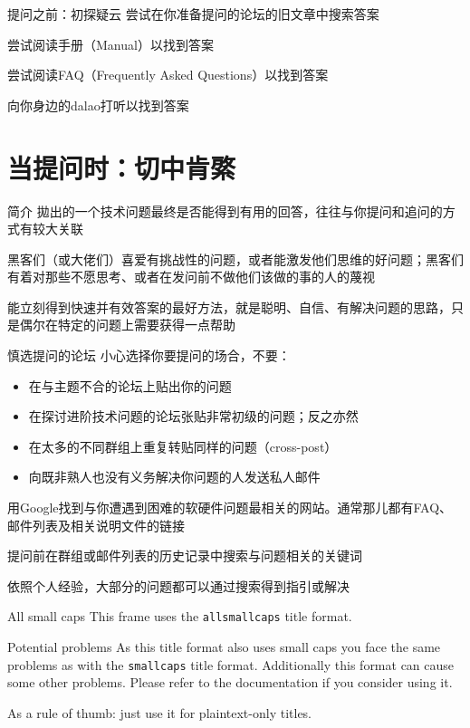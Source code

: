 \documentclass[10pt]{beamer}
\begin{document}
\begin{frame}[fragile]{提问之前：初探疑云}
    尝试在你准备提问的论坛的旧文章中搜索答案

    尝试阅读手册（Manual）以找到答案

    尝试阅读FAQ（Frequently Asked Questions）以找到答案

    向你身边的dalao打听以找到答案
\end{frame}


\section{当提问时：切中肯綮}

\begin{frame}{简介}
    拋出的一个技术问题最终是否能得到有用的回答，往往与你提问和追问的方式有较大关联

    黑客们（或大佬们）喜爱有挑战性的问题，或者能激发他们思维的好问题；黑客们有着对那些不愿思考、或者在发问前不做他们该做的事的人的蔑视

    能立刻得到快速并有效答案的最好方法，就是聪明、自信、有解决问题的思路，只是偶尔在特定的问题上需要获得一点帮助
\end{frame}

\begin{frame}{慎选提问的论坛}
    小心选择你要提问的场合，不要：

    \begin{itemize}
        \item 在与主题不合的论坛上贴出你的问题
        \item 在探讨进阶技术问题的论坛张贴非常初级的问题；反之亦然
        \item 在太多的不同群组上重复转贴同样的问题（cross-post）
        \item 向既非熟人也没有义务解决你问题的人发送私人邮件
    \end{itemize}

    用Google找到与你遭遇到困难的软硬件问题最相关的网站。通常那儿都有FAQ、邮件列表及相关说明文件的链接

    提问前在群组或邮件列表的历史记录中搜索与问题相关的关键词

    依照个人经验，大部分的问题都可以通过搜索得到指引或解决
\end{frame}

{
\begin{frame}{All small caps}
    This frame uses the \texttt{allsmallcaps} title format.

    \begin{alertblock}{Potential problems}
        As this title format also uses small caps you face the same problems as with the \texttt{smallcaps} title format. Additionally this format can cause some other problems. Please refer to the documentation if you consider using it.

        As a rule of thumb: just use it for plaintext-only titles.
    \end{alertblock}
\end{frame}
}
\end{document}
